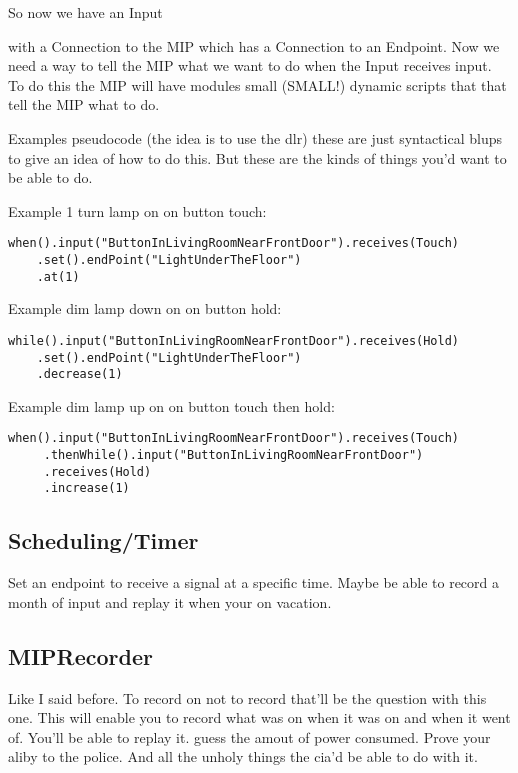 \documentclass[a4paper]{article}
\begin{document}
So now we have an Input                                                






with a Connection to the MIP which has a Connection to an Endpoint. Now we need a way to tell the MIP what we want to do when the Input receives input. To do this the MIP will have modules small (SMALL!) dynamic scripts that that tell the MIP what to do. 

Examples pseudocode (the idea is to use the dlr) these are just syntactical blups to give an idea of how to do this. But these are the kinds of things you'd want to be able to do.

Example 1 turn lamp on on button touch:
\begin{verbatim}
when().input("ButtonInLivingRoomNearFrontDoor").receives(Touch)
    .set().endPoint("LightUnderTheFloor")
    .at(1)
\end{verbatim}

Example dim lamp down on on button hold:
\begin{verbatim}
while().input("ButtonInLivingRoomNearFrontDoor").receives(Hold)
    .set().endPoint("LightUnderTheFloor")
    .decrease(1)
\end{verbatim}

Example dim lamp up on on button touch then hold:
\begin{verbatim}
when().input("ButtonInLivingRoomNearFrontDoor").receives(Touch)
     .thenWhile().input("ButtonInLivingRoomNearFrontDoor")
     .receives(Hold)
     .increase(1)
\end{verbatim}
 
\subsection{Scheduling/Timer}
Set an endpoint to receive a signal at a specific time. Maybe be able to record a month of input and replay it when your on vacation.

\subsection{MIPRecorder}
Like I said before. To record on not to record that'll be the question with this one. This will enable you to record what was on when it was on and when it went of. You'll be able to replay it. guess the amout of power consumed. Prove your aliby to the police. And all the unholy things the cia'd be able to do with it.
\end{document}
